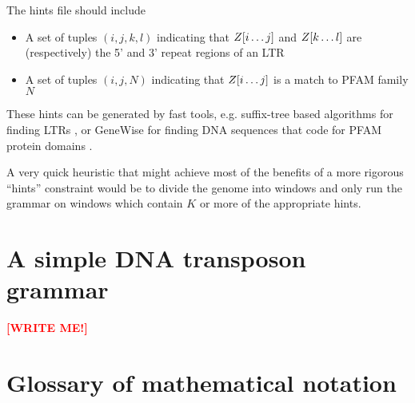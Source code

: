 \documentclass[10pt]{article}
\newcommand{\seclabel}[1]{\label{sec:#1}}
\newcommand\redpen[1]{{\bf \textcolor{red}{#1}} \textcolor{black}{}}
\newcommand\writeme{\redpen{\bf [WRITE ME!]}}
\begin{document}
The hints file should include
\begin{itemize}
\item A set of tuples $(i,j,k,l)$ indicating that $Z[i \ldots j]$ and $Z[k \ldots l]$ are (respectively) the 5' and 3' repeat regions of an LTR
\item A set of tuples $(i,j,N)$ indicating that $Z[i \ldots j]$ is a match to PFAM family $N$
\end{itemize}

These hints can be generated by fast tools, e.g. suffix-tree based algorithms for finding LTRs \cite{pmid16819780},
or GeneWise for finding DNA sequences that code for PFAM protein domains \cite{BirneyEtAl04}.

A very quick heuristic that might achieve most of the benefits of a more rigorous ``hints'' constraint
would be to divide the genome into windows and only run the grammar on windows which contain $K$ or more of the appropriate hints.

\section{A simple DNA transposon grammar}
\seclabel{TransposonGrammar}

\writeme

\section{Glossary of mathematical notation}
\end{document}
